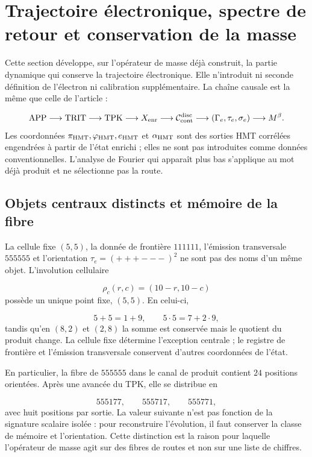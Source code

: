 \section{Trajectoire électronique, spectre de retour et conservation de la masse
}
\label{vi:sec:trayectoria-espectral-masa}

Cette section développe, sur l’opérateur de masse déjà construit, la partie
dynamique qui conserve la trajectoire électronique. Elle n’introduit ni seconde
définition de l’électron ni calibration supplémentaire. La chaîne causale est la
même que celle de l’article :

\[
 \mathrm{APP}\longrightarrow\mathrm{TRIT}\longrightarrow\mathrm{TPK}
 \longrightarrow X_{\rm enr}
 \longrightarrow\mathcal C_{\rm cont}^{\rm disc}
 \longrightarrow (\Gamma_e,\tau_e,\sigma_e)
 \longrightarrow M^\beta .
\]
Les coordonnées $\pi_{\rm HMT},\varphi_{\rm HMT},e_{\rm HMT}$ et
$\alpha_{\rm HMT}$ sont des sorties HMT corrélées engendrées à partir de l’état
enrichi ; elles ne sont pas introduites comme données conventionnelles. L’analyse de Fourier
qui apparaît plus bas s’applique au mot déjà produit et ne sélectionne pas la route.


\subsection{Objets centraux distincts et mémoire de la fibre
}

La cellule fixe $(5,5)$, la donnée de frontière $111111$, l’émission transversale
$555555$ et l’orientation $\tau_e=(+++---)^2$ ne sont pas des noms d’un même
objet. L’involution cellulaire

\[
 \rho_c(r,c)=(10-r,10-c)
\]
possède un unique point fixe, $(5,5)$. En celui-ci,

\[
 5+5=1+9,\qquad 5\cdot5=7+2\cdot9,
\]
tandis qu’en $(8,2)$ et $(2,8)$ la somme est conservée mais le quotient
du produit change. La cellule fixe détermine l’exception centrale ; le registre de
frontière et l’émission transversale conservent d’autres coordonnées de l’état.


En particulier, la fibre de $555555$ dans le canal de produit contient
$24$ positions orientées. Après une avancée du TPK, elle se distribue en

\[
 555177,\qquad 555717,\qquad 555771,
\]
avec huit positions par sortie. La valeur suivante n’est pas fonction de la signature
scalaire isolée : pour reconstruire l’évolution, il faut conserver la classe de
mémoire et l’orientation. Cette distinction est la raison pour laquelle l’opérateur
de masse agit sur des fibres de routes et non sur une liste de chiffres.


